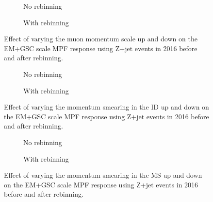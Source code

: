 \begin{figure}[!ht]
  \centering
  \begin{subfigure}{.5\textwidth}
    \centering
    \caption{No rebinning}
  \end{subfigure}%
  \begin{subfigure}{.5\textwidth}  \centering
    \caption{With rebinning}
  \end{subfigure}
  \caption{Effect of varying the muon momentum scale up and down on the EM+GSC scale MPF response using Z+jet events in 2016 before and after rebinning. }
  \label{Fig:MuonsScaleZJetEM2016}
\end{figure}

\begin{figure}[!ht]
  \centering
  \begin{subfigure}{.5\textwidth}
    \centering
    \caption{No rebinning}
  \end{subfigure}%
  \begin{subfigure}{.5\textwidth}  \centering
    \caption{With rebinning}
  \end{subfigure}
  \caption{Effect of varying the momentum smearing in the ID up and down on the EM+GSC scale MPF response using Z+jet events in 2016 before and after rebinning. }
  \label{Fig:MuonsIDZJetEM2016}
\end{figure}

\begin{figure}[!ht]
  \centering
  \begin{subfigure}{.5\textwidth}
    \centering
    \caption{No rebinning}
  \end{subfigure}%
  \begin{subfigure}{.5\textwidth}  \centering
    \caption{With rebinning}
  \end{subfigure}
  \caption{Effect of varying the momentum smearing in the MS up and down on the EM+GSC scale MPF response using Z+jet events in 2016 before and after rebinning. }
  \label{Fig:MuonsMSZJetEM2016}
\end{figure}


